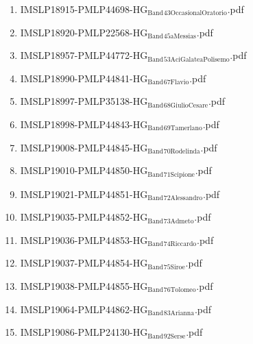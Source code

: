 \documentclass[11pt]{article}
\begin{document}
\begin{enumerate}
\begin{enumerate}
\item IMSLP18915-PMLP44698-HG$_{\text{Band}}$$_{\text{43OccasionalOratorio}}$.pdf
\label{sec-1-1-1-1-44-37-2-11}

\item IMSLP18920-PMLP22568-HG$_{\text{Band}}$$_{\text{45aMessias}}$.pdf
\label{sec-1-1-1-1-44-37-2-12}

\item IMSLP18957-PMLP44772-HG$_{\text{Band}}$$_{\text{53AciGalateaPolisemo}}$.pdf
\label{sec-1-1-1-1-44-37-2-13}

\item IMSLP18990-PMLP44841-HG$_{\text{Band}}$$_{\text{67Flavio}}$.pdf
\label{sec-1-1-1-1-44-37-2-14}

\item IMSLP18997-PMLP35138-HG$_{\text{Band}}$$_{\text{68GiulioCesare}}$.pdf
\label{sec-1-1-1-1-44-37-2-15}

\item IMSLP18998-PMLP44843-HG$_{\text{Band}}$$_{\text{69Tamerlano}}$.pdf
\label{sec-1-1-1-1-44-37-2-16}

\item IMSLP19008-PMLP44845-HG$_{\text{Band}}$$_{\text{70Rodelinda}}$.pdf
\label{sec-1-1-1-1-44-37-2-17}

\item IMSLP19010-PMLP44850-HG$_{\text{Band}}$$_{\text{71Scipione}}$.pdf
\label{sec-1-1-1-1-44-37-2-18}

\item IMSLP19021-PMLP44851-HG$_{\text{Band}}$$_{\text{72Alessandro}}$.pdf
\label{sec-1-1-1-1-44-37-2-19}

\item IMSLP19035-PMLP44852-HG$_{\text{Band}}$$_{\text{73Admeto}}$.pdf
\label{sec-1-1-1-1-44-37-2-20}

\item IMSLP19036-PMLP44853-HG$_{\text{Band}}$$_{\text{74Riccardo}}$.pdf
\label{sec-1-1-1-1-44-37-2-21}

\item IMSLP19037-PMLP44854-HG$_{\text{Band}}$$_{\text{75Siroe}}$.pdf
\label{sec-1-1-1-1-44-37-2-22}

\item IMSLP19038-PMLP44855-HG$_{\text{Band}}$$_{\text{76Tolomeo}}$.pdf
\label{sec-1-1-1-1-44-37-2-23}

\item IMSLP19064-PMLP44862-HG$_{\text{Band}}$$_{\text{83Arianna}}$.pdf
\label{sec-1-1-1-1-44-37-2-24}

\item IMSLP19086-PMLP24130-HG$_{\text{Band}}$$_{\text{92Serse}}$.pdf
\label{sec-1-1-1-1-44-37-2-25}


\end{enumerate}
\end{enumerate}
\end{document}
